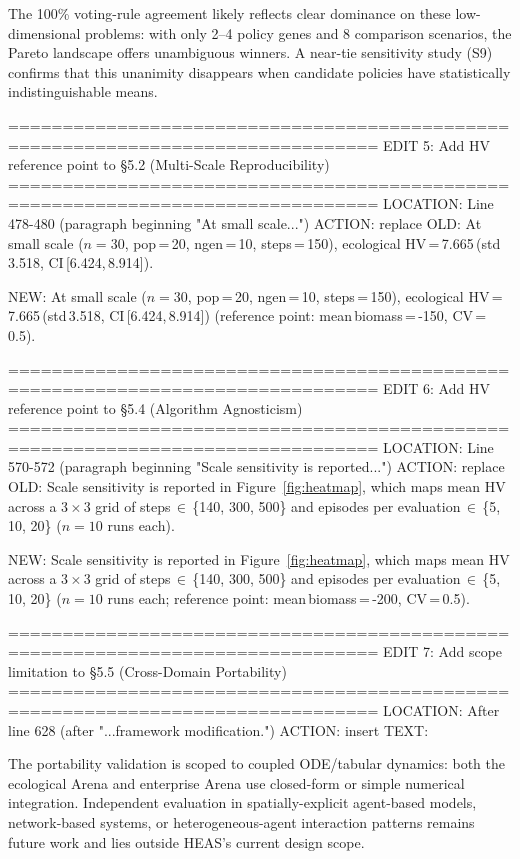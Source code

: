 The 100\% voting-rule agreement likely reflects clear dominance on these
low-dimensional problems: with only 2--4 policy genes and 8 comparison scenarios,
the Pareto landscape offers unambiguous winners. A near-tie sensitivity study
(S9) confirms that this unanimity disappears when candidate policies have
statistically indistinguishable means.

================================================================================
EDIT 5: Add HV reference point to §5.2 (Multi-Scale Reproducibility)
================================================================================
LOCATION: Line 478-480 (paragraph beginning "At small scale...")
ACTION: replace
OLD:
At small scale
($n\!=\!30$, pop\,=\,20, ngen\,=\,10, steps\,=\,150),
ecological HV\,=\,7.665\,(std\,3.518, CI\,[6.424,\,8.914]).

NEW:
At small scale
($n\!=\!30$, pop\,=\,20, ngen\,=\,10, steps\,=\,150),
ecological HV\,=\,7.665\,(std\,3.518, CI\,[6.424,\,8.914]) (reference point:
mean\,biomass\,=\,-150, CV\,=\,0.5).

================================================================================
EDIT 6: Add HV reference point to §5.4 (Algorithm Agnosticism)
================================================================================
LOCATION: Line 570-572 (paragraph beginning "Scale sensitivity is reported...")
ACTION: replace
OLD:
Scale sensitivity is reported in Figure~\ref{fig:heatmap}, which maps mean HV
across a 3\,$\times$\,3 grid of steps\,$\in$\,\{140, 300, 500\} and episodes per
evaluation\,$\in$\,\{5, 10, 20\} ($n\!=\!10$ runs each).

NEW:
Scale sensitivity is reported in Figure~\ref{fig:heatmap}, which maps mean HV
across a 3\,$\times$\,3 grid of steps\,$\in$\,\{140, 300, 500\} and episodes per
evaluation\,$\in$\,\{5, 10, 20\} ($n\!=\!10$ runs each; reference point:
mean\,biomass\,=\,-200, CV\,=\,0.5).

================================================================================
EDIT 7: Add scope limitation to §5.5 (Cross-Domain Portability)
================================================================================
LOCATION: After line 628 (after "...framework modification.")
ACTION: insert
TEXT:

The portability validation is scoped to coupled ODE/tabular dynamics: both the
ecological Arena and enterprise Arena use closed-form or simple numerical
integration. Independent evaluation in spatially-explicit agent-based models,
network-based systems, or heterogeneous-agent interaction patterns remains
future work and lies outside HEAS's current design scope.

